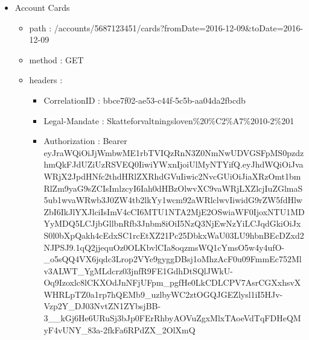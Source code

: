\documentclass[12pt]{report}
\begin{document}
\begin{itemize}
  \item Account Cards
  \begin{itemize}
    \item path : /accounts/5687123451/cards?fromDate=2016-12-09&toDate=2016-12-09
    \item method : GET
    \item headers :
    \begin{itemize}
      \item CorrelationID : bbce7f02-ae53-c44f-5c5b-aa04da2fbcdb
      \item Legal-Mandate : Skatteforvaltningsloven\%20\%C2\%A7\%2010-2\%201
      \item Authorization : Bearer eyJraWQiOiJjWmbwME1rbTVIQzRnN3Z0NmNwUDVGSFpMS0pzdzhmQkFJdUZiUzRSVEQ0IiwiYWxnIjoiUlMyNTYifQ.eyJhdWQiOiJvaWRjX2JpdHNfc2thdHRlZXRhdGVuIiwic2NvcGUiOiJiaXRzOmt1bmRlZm9yaG9sZCIsImlzcyI6Iah0dHBzOlwvXC9vaWRjLXZlcjIuZGlmaS5ub1wvaWRwb3J0ZW4tb2lkYy1wcm92aWRlclwvIiwidG9rZW5fdHlwZbI6IkJlYXJlciIsImV4cCI6MTU1NTA2MjE2OSwiaWF0IjoxNTU1MDYyMDQ5LCJjbGllbnRfb3Jnbm8iOiI5NzQ3NjEwNzYiLCJqdGkiOiJxS0l0bXpQakh4cEdxSC1rcEtXZ21Pc25DbkxWaU03LU9hbnBEcDZxd2NJPSJ9.1qQ2jjequOz0OLKbvlCIa8oqzmsWQ1cYmsO5w4y4ufO-\_o5sQQ4VX6jqdc3Lrop2VYe9gyggDBsj1oMhzAcF0u09FmmEc752Mlv3ALWT\_YgMLdcrz03jnfR9FE1GdhDtSQlJWkU-Oq9Izoxlc8lCKXOdJnNFjUFpm\_pgfHe0LkCDLCPV7AsrCGXxhsvXWHRLpTZ0a1rp7hQEMb9\_uzlbyWC2ztOGQJGEZlysl1iI5HJv-Vzp2Y\_DJ03NvtZN1ZYbsjBB-3\_\_kGj6He6URuSj3bJp0FErRhbyAOVuZgxMlxTAoeVdTqFDHeQMyF4vUNY\_83a-2fkFa6RPdZX\_2OlXmQ
    \end{itemize}
  \end{itemize}
\end{itemize}
\end{document}
